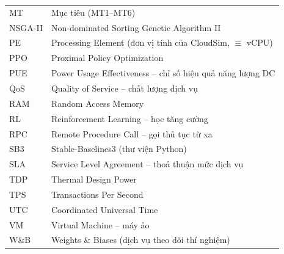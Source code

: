 \begin{appendices}
\begin{table}[H]
\begin{tabularx}{\linewidth}{l X}
    MT      & Mục tiêu (MT1--MT6) \\
    NSGA-II & Non-dominated Sorting Genetic Algorithm II \\
    PE      & Processing Element (đơn vị tính của CloudSim, $\equiv$ vCPU) \\
    PPO     & Proximal Policy Optimization \\
    PUE     & Power Usage Effectiveness -- chỉ số hiệu quả năng lượng DC \\
    QoS     & Quality of Service -- chất lượng dịch vụ \\
    RAM     & Random Access Memory \\
    RL      & Reinforcement Learning -- học tăng cường \\
    RPC     & Remote Procedure Call -- gọi thủ tục từ xa \\
    SB3     & Stable-Baselines3 (thư viện Python) \\
    SLA     & Service Level Agreement -- thoả thuận mức dịch vụ \\
    TDP     & Thermal Design Power \\
    TPS     & Transactions Per Second \\
    UTC     & Coordinated Universal Time \\
    VM      & Virtual Machine -- máy ảo \\
    W\&B    & Weights \& Biases (dịch vụ theo dõi thí nghiệm) \\
    \bottomrule
  \end{tabularx}
\end{table}

\end{appendices}
